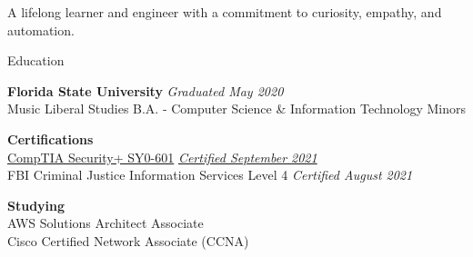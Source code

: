 \documentclass{resume} %
\begin{document}
	\begin{center}{\vspace{-0.1cm}A lifelong learner and engineer with a commitment to curiosity, empathy, and automation.\vspace{-0.1cm}}\end{center}
	\begin{rSection}{Education}
		
		{\bf Florida State University} \hfill {\em Graduated May 2020} \\
		Music Liberal Studies B.A. - Computer Science \& Information Technology Minors
		
		{\bf Certifications} \hfill {\em } \\
		\href{https://www.credly.com/badges/fb3524b2-ef52-4c7b-9854-e00dd92e7046?source=linked_in_profile}{CompTIA Security+ SY0-601} \hfill \href{https://www.credly.com/badges/fb3524b2-ef52-4c7b-9854-e00dd92e7046?source=linked_in_profile}{\em Certified  September 2021}\\
		FBI Criminal Justice Information Services Level 4 \hfill {\em Certified August 2021}
		
		{\bf Studying}\\
		AWS Solutions Architect Associate\\
		Cisco Certified Network Associate (CCNA)
	\end{rSection}

	
\end{document}

